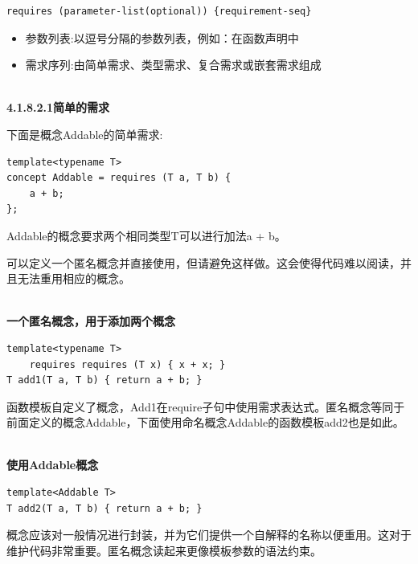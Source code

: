 \begin{lstlisting}[style=styleCXX]
requires (parameter-list(optional)) {requirement-seq}
\end{lstlisting}

\begin{itemize}
\item
参数列表:以逗号分隔的参数列表，例如：在函数声明中

\item
需求序列:由简单需求、类型需求、复合需求或嵌套需求组成
\end{itemize}

\hspace*{\fill} \\ %
\noindent
\textbf{4.1.8.2.1\hspace{0.2cm}简单的需求}

下面是概念Addable的简单需求:

\begin{lstlisting}[style=styleCXX]
template<typename T>
concept Addable = requires (T a, T b) {
	a + b;
};
\end{lstlisting}

Addable的概念要求两个相同类型T可以进行加法a + b。

\begin{tcolorbox}[breakable,enhanced jigsaw,colback=blue!5!white,colframe=blue!75!black,title={避免使用匿名概念}]

可以定义一个匿名概念并直接使用，但请避免这样做。这会使得代码难以阅读，并且无法重用相应的概念。

\hspace*{\fill} \\ %
\noindent
\textbf{一个匿名概念，用于添加两个概念}
\begin{lstlisting}[style=styleCXX]
template<typename T>
	requires requires (T x) { x + x; }
T add1(T a, T b) { return a + b; }
\end{lstlisting}

函数模板自定义了概念，Add1在require子句中使用需求表达式。匿名概念等同于前面定义的概念Addable，下面使用命名概念Addable的函数模板add2也是如此。

\hspace*{\fill} \\ %
\noindent
\textbf{使用Addable概念}
\begin{lstlisting}[style=styleCXX]
template<Addable T>
T add2(T a, T b) { return a + b; }
\end{lstlisting}

概念应该对一般情况进行封装，并为它们提供一个自解释的名称以便重用。这对于维护代码非常重要。匿名概念读起来更像模板参数的语法约束。

\end{tcolorbox}

